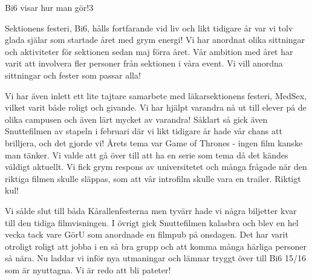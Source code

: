 \begin{news}{3}{Bi6 visar hur man gör!}{}{}{3}

Sektionens festeri, Bi6, hålls fortfarande vid liv och likt tidigare år var
vi tolv glada själar som startade året med grym energi! Vi har anordnat olika
sittningar och aktiviteter för sektionen sedan maj förra året. Vår ambition med
året har varit att involvera fler personer från sektionen i våra event. Vi vill
anordna sittningar och fester som passar alla! 

Vi har även inlett ett lite
tajtare samarbete med läkarsektionens festeri, MedSex, vilket varit både roligt
och givande. Vi har hjälpt varandra nå ut till elever på de olika campusen och
även lärt mycket av varandra! Såklart så gick även Snuttefilmen av stapeln i
februari där vi likt tidigare år hade vår chans att brilljera, och det gjorde
vi! Årets tema var Game of Thrones - ingen film kanske man tänker. Vi valde att
gå över till att ha en serie som tema då det kändes väldigt aktuellt. Vi fick
grym respons av universitetet och många frågade när den riktiga filmen skulle
släppas, som att vår introfilm skulle vara en trailer. Riktigt kul!

Vi sålde slut till båda Kårallenfesterna men tyvärr hade vi några biljetter 
kvar till den tidiga filmvisningen. I övrigt gick Snuttefilmen kalasbra och 
blev en hel vecka tack vare GörU som anordnade en filmpub på onsdagen. Det har 
varit otroligt roligt att jobba i en så bra grupp och att komma många härliga
personer så nära. Nu laddar vi inför nya utmaningar och lämnar tryggt över till
Bi6 15/16 som är nyuttagna. Vi är redo att bli pateter!
\\



\end{news}
